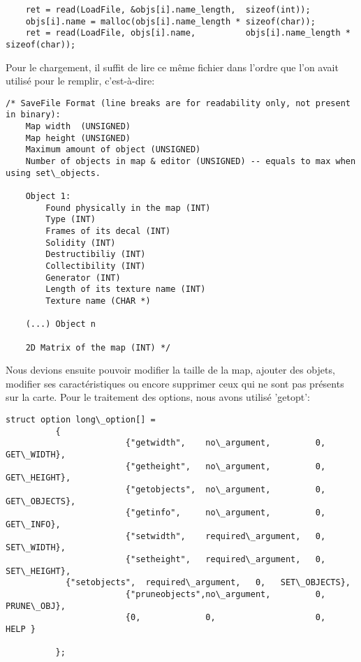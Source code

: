\documentclass[a4paper]{article}
\begin{document}
\begin{verbatim}
    ret = read(LoadFile, &objs[i].name_length,  sizeof(int));
    objs[i].name = malloc(objs[i].name_length * sizeof(char));
    ret = read(LoadFile, objs[i].name,          objs[i].name_length * sizeof(char));
\end{verbatim}   

Pour le chargement, il suffit de lire ce même fichier dans l'ordre que l'on avait utilisé pour le remplir, c'est-à-dire:

\begin{verbatim}
/* SaveFile Format (line breaks are for readability only, not present in binary):
    Map width  (UNSIGNED)
    Map height (UNSIGNED)
    Maximum amount of object (UNSIGNED)
    Number of objects in map & editor (UNSIGNED) -- equals to max when using set\_objects.

    Object 1:
        Found physically in the map (INT)
        Type (INT)
        Frames of its decal (INT)
        Solidity (INT)
        Destructibiliy (INT)
        Collectibility (INT)
        Generator (INT)
        Length of its texture name (INT)
        Texture name (CHAR *)

    (...) Object n

    2D Matrix of the map (INT) */
\end{verbatim}

Nous devions ensuite pouvoir modifier la taille de la map, ajouter des objets, modifier ses caractéristiques ou encore supprimer ceux qui ne sont pas présents sur la carte.
Pour le traitement des options, nous avons utilisé 'getopt':

\begin{verbatim}
struct option long\_option[] =
		  {
                        {"getwidth",    no\_argument,         0,   GET\_WIDTH},
                        {"getheight",   no\_argument,         0,   GET\_HEIGHT},
                        {"getobjects",  no\_argument,         0,   GET\_OBJECTS},
                        {"getinfo",     no\_argument,         0,   GET\_INFO},
                        {"setwidth",    required\_argument,   0,   SET\_WIDTH},
                        {"setheight",   required\_argument,   0,   SET\_HEIGHT},
			{"setobjects",  required\_argument,   0,   SET\_OBJECTS},
                        {"pruneobjects",no\_argument,         0,   PRUNE\_OBJ},
                        {0,             0,                    0,   HELP }

		  };
\end{verbatim} 
\end{document}
